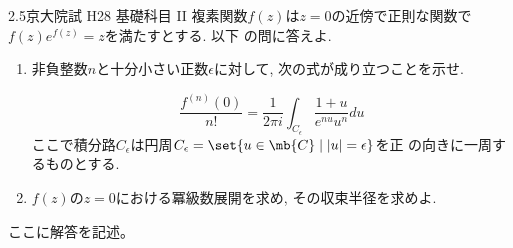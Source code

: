 \begin{prob}{2.5}{}{京大院試 H28 基礎科目 II}
複素関数$f(z)$は$z=0$の近傍で正則な関数で$f(z)e^{f(z)} = z$を満たすとする. 以下
の問に答えよ.
\begin{enumerate}
\item 非負整数$n$と十分小さい正数$\epsilon$に対して, 次の式が成り立つことを示せ.

\[
\dfrac{f^{(n)}(0)}{n!} = \dfrac{1}{2\pi i} \int_{C_{\epsilon}} \dfrac{1+u}{e^{nu} u^n} du
\]
ここで積分路$C_{\epsilon}$は円周$C_{\epsilon} = \set{u\in \mb{C} \mid |u| = \epsilon}$を正
の向きに一周するものとする.
\item $f(z)$の$z=0$における冪級数展開を求め, その収束半径を求めよ.
\end{enumerate}
\end{prob}

ここに解答を記述。
